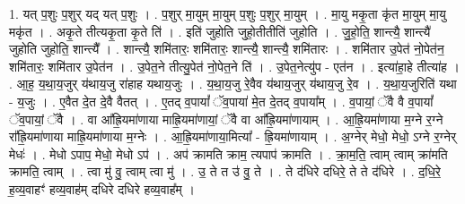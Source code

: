 \documentclass[17pt]{extarticle}
\begin{document}
1. यत् प॒शुः प॒शुर् यद् यत् प॒शुः । . प॒शुर् मा॒युम् मा॒युम् प॒शुः प॒शुर् मा॒युम् । . मा॒यु मकृ॒ता कृ॑त मा॒युम् मा॒यु मकृ॑त । . अकृ॒ते तीत्यकृ॒ता कृ॒ते ति॑ । . इति॑ जुहोति जुहो॒तीतीति॑ जुहोति । . जु॒हो॒ति॒ शान्त्यै॒ शान्त्यै॑ जुहोति जुहोति॒ शान्त्यै᳚ । . शान्त्यै॒ शमि॑तारः॒ शमि॑तारः॒ शान्त्यै॒ शान्त्यै॒ शमि॑तारः । . शमि॑तार उ॒पेत॑ नो॒पेत॑न॒ शमि॑तारः॒ शमि॑तार उ॒पेत॑न । . उ॒पेत॒ने तीत्यु॒पेत॑ नो॒पेत॒ने ति॑ । . उ॒पेत॒नेत्यु॑प - एत॑न । . इत्या॑हा॒हे तीत्या॑ह । . आ॒ह॒ य॒था॒य॒जुर् य॑थाय॒जु रा॑हाह यथाय॒जुः । . य॒था॒य॒जु रे॒वैव य॑थाय॒जुर् य॑थाय॒जु रे॒व । . य॒था॒य॒जुरिति॑ यथा - य॒जुः । . ए॒वैत दे॒त दे॒वै वैतत् । . ए॒तद् व॒पायां᳚ ॅव॒पाया॑ मे॒त दे॒तद् व॒पाया᳚म् । . व॒पायां॒ ॅवै वै व॒पायां᳚ ॅव॒पायां॒ ॅवै । . वा आ᳚ह्रि॒यमा॑णाया माह्रि॒यमा॑णायां॒ ॅवै वा आ᳚ह्रि॒यमा॑णायाम् । . आ॒ह्रि॒यमा॑णाया म॒ग्ने र॒ग्ने रा᳚ह्रि॒यमा॑णाया माह्रि॒यमा॑णाया म॒ग्नेः । . आ॒ह्रि॒यमा॑णाया॒मित्या᳚ - ह्रि॒यमा॑णायाम् । . अ॒ग्नेर् मेधो॒ मेधो॒ ऽग्ने र॒ग्नेर् मेधः॑ । . मेधो ऽपाप॒ मेधो॒ मेधो ऽप॑ । . अप॑ क्रामति क्राम॒ त्यपाप॑ क्रामति । . क्रा॒म॒ति॒ त्वाम् त्वाम् क्रा॑मति क्रामति॒ त्वाम् । . त्वा मु॑ वु॒ त्वाम् त्वा मु॑ । . उ॒ ते त उ॑ वु॒ ते । . ते द॑धिरे दधिरे॒ ते ते द॑धिरे । . द॒धि॒रे॒ ह॒व्य॒वाहꣳ॑ हव्य॒वाह॑म् दधिरे दधिरे हव्य॒वाह᳚म् । \newline
\end{document}
